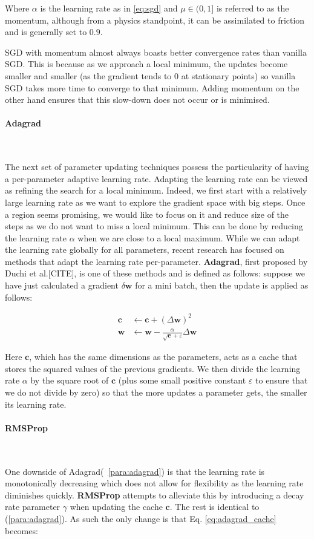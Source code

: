 \documentclass[12pt,twoside]{article}
\newcommand{\para}[1]{\paragraph{#1}\mbox{}\\}
\begin{document}
Where $\alpha$ is the learning rate as in \eqref{eq:sgd} and $\mu \in (0,1]$ is referred
to as the momentum, although from a physics standpoint, it can be assimilated
to friction and is generally set to $0.9$.

SGD with momentum almost always boasts better convergence rates than vanilla
SGD. This is because as we approach a local minimum, the updates become smaller
and smaller (as the gradient tends to 0 at stationary points) so vanilla SGD
takes more time to converge to that minimum. Adding momentum on the other hand
ensures that this slow-down does not occur or is minimised.
\para{Adagrad}\label{para:adagrad}

The next set of parameter updating techniques possess the particularity of
having a per-parameter adaptive learning rate. Adapting the learning rate can
be viewed as refining the search for a local minimum. Indeed, we first start
with a relatively large learning rate as we want to explore the gradient space
with big steps. Once a region seems promising, we would like to focus on it and
reduce size of the steps as we do not want to miss a local minimum. This can be
done by reducing the learning rate $\alpha$ when we are close to a local
maximum. While we can adapt the learning rate globally for all parameters,
recent research has focused on methods that adapt the learning rate per-parameter.
\textbf{Adagrad}, first proposed by Duchi et al.[CITE], is one of these
methods and is defined as follows: suppose we have just calculated a gradient
$\delta\bm{w}$ for a mini batch, then the update is applied as follows:

\begin{align}
  \bm{c} &\leftarrow \bm{c} + \left( \Delta\bm{w} \right)^2
  \label{eq:adagrad_cache}\\
  \bm{w} &\leftarrow \bm{w} - \frac{\alpha}{\sqrt{\bm{c}} + \varepsilon}
  \Delta\bm{w}
  \label{eq:adagrad}
\end{align}

Here $\bm{c}$, which has the same dimensions as the parameters, acts as a cache
that stores the squared values of the previous gradients. We then divide the
learning rate $\alpha$ by the square root of $\bm{c}$ (plus some small positive
constant $\varepsilon$ to ensure that we do not divide by zero) so that the
more updates a parameter gets, the smaller its learning rate.

\para{RMSProp}\label{para:rmsprop}

One downside of Adagrad(~\ref{para:adagrad}) is that the learning rate is
monotonically decreasing which does not allow for flexibility as the learning
rate diminishes quickly.
\textbf{RMSProp} attempts to alleviate this by introducing a decay rate
parameter $\gamma$ when updating the cache $\bm{c}$. The rest is identical to
(\ref{para:adagrad}). As such the only change is that Eq.
\eqref{eq:adagrad_cache} becomes:
\end{document}
